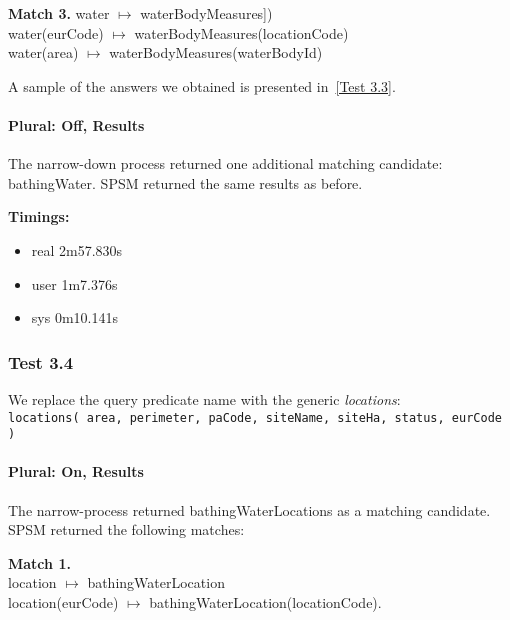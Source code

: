 \documentclass[a4paper,10pt]{article}
\begin{document}
\textbf{Match 3. }
water $\mapsto$  waterBodyMeasures])\\
water(eurCode) $\mapsto$  waterBodyMeasures(locationCode)\\
water(area) $\mapsto$  waterBodyMeasures(waterBodyId)


A sample of the answers we obtained is presented in~\ref{Test 3.3}.

\paragraph{Plural: Off, Results} The narrow-down process returned one additional matching candidate: bathingWater. SPSM returned the same results as before.

\textbf{Timings: }
\begin{itemize}
\item real	2m57.830s
\item user	1m7.376s
\item sys	0m10.141s

\end{itemize}

\subsubsection{Test 3.4} We replace the query predicate name with the generic \textit{locations}:
\\
\indent \texttt{locations( area, perimeter, paCode, siteName, siteHa, status, eurCode )}

\paragraph{Plural: On, Results}The narrow-process returned bathingWaterLocations as a matching candidate. SPSM returned the following matches:

\textbf{Match 1.}\\
location $\mapsto$ bathingWaterLocation\\
location(eurCode) $\mapsto$ bathingWaterLocation(locationCode).
\end{document}

